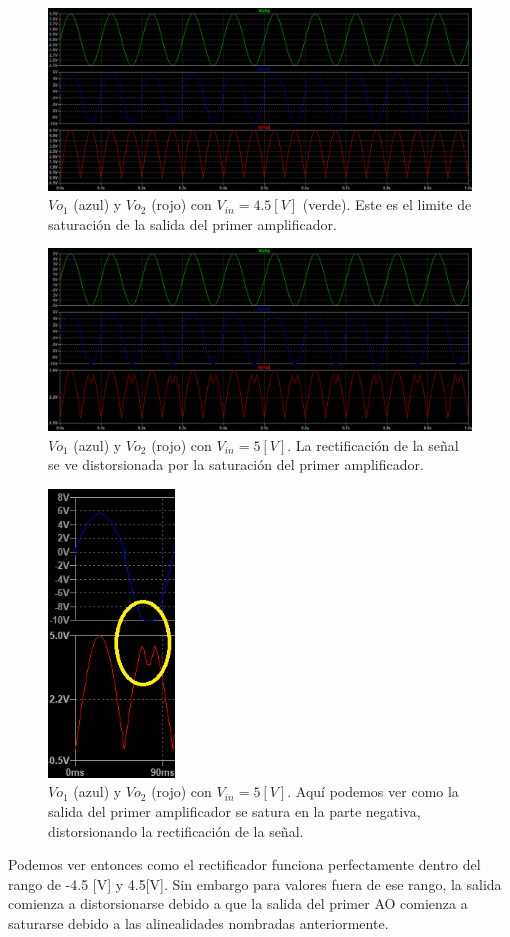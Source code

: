 \documentclass[11pt, a4paper]{article}
\begin{document}
\begin{figure}[H]
	\centering
	\includegraphics[width=1\textwidth]{Imagenes/Vin4.5LimiteSat.png}
	\caption{$Vo_1$ (azul) y $Vo_2$ (rojo) con $V_{in}=4.5[V]$ (verde). Este es el limite de saturación de la salida del primer amplificador.}
\end{figure}
\begin{figure}[H]
	\centering
	\includegraphics[width=1\textwidth]{Imagenes/Vin5v.png}
	\caption{$Vo_1$ (azul) y $Vo_2$ (rojo) con $V_{in}=5[V]$. La rectificación de la señal se ve distorsionada por la saturación del primer amplificador.}
\end{figure}
\begin{figure}[H]
	\centering
	\includegraphics[width=0.3\textwidth]{Imagenes/Saturacionzoom.png}
	\caption{$Vo_1$ (azul) y $Vo_2$ (rojo) con $V_{in}=5[V]$. Aquí podemos ver como la salida del primer amplificador se satura en la parte negativa, distorsionando la rectificación de la señal.}
\end{figure}
Podemos ver entonces como el rectificador funciona perfectamente dentro del rango de -4.5 [V] y 4.5[V]. Sin embargo para valores fuera de ese rango, la salida comienza a distorsionarse debido a que la salida del primer AO comienza a saturarse debido a las alinealidades nombradas anteriormente.
\end{document}
